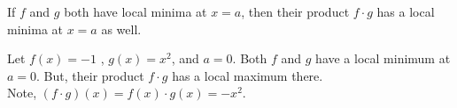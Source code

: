 \documentclass{ximera}
\author{Steven Gubkin\and Nela Lakos}
\begin{document}
\begin{exercise}


If $f$ and $g$ both have local minima at $x=a$, then their product $f\cdot g$ has a local minima at $x=a$ as well.
	\begin{hint}
Let $f(x)=-1$ , $g(x)=x^2$, and $a=0$. Both $f$ and $g$ have a local minimum at $a=0$. But, their product $f\cdot g$ has a local maximum there.\\
Note, $(f\cdot g)(x)=f(x)\cdot g(x)=-x^2$.
\end{hint}	
\begin{multipleChoice}	
\end{multipleChoice}

\end{exercise}
\end{document}
